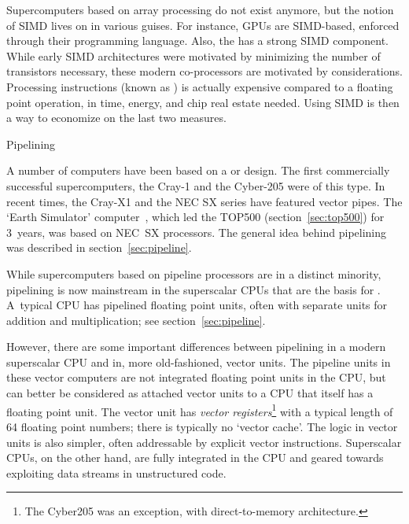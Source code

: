Supercomputers based on array processing do not exist anymore, but the
notion of SIMD lives on in various guises. For instance, \acp{GPU}
are SIMD-based, enforced through their 
programming language. Also, the  has a
strong SIMD component. While early SIMD architectures were motivated
by minimizing the number of transistors necessary, these modern
co-processors are motivated by 
considerations. Processing instructions (known as
) is actually expensive compared to a
floating point operation, in time, energy, and chip real estate needed.
Using SIMD is then a way to economize on the last two measures.

 {Pipelining}
\label{sec:vector}

A number of computers have been based on a  or  design. The first
commercially successful supercomputers, the Cray-1 and the Cyber-205
were of this type. In recent times, the Cray-X1 and the NEC SX series
have featured vector pipes. The `Earth Simulator'
computer~\cite{Sato2004}, which led the TOP500
(section~\ref{sec:top500}) for 3~years, was based on NEC~SX
processors.  The general idea behind pipelining was described in
section~\ref{sec:pipeline}.

While supercomputers based on pipeline processors are in a distinct
minority, pipelining is now mainstream in the superscalar CPUs that
are the basis for . A~typical CPU has pipelined floating point
units, often with separate units for addition and multiplication; see
section~\ref{sec:pipeline}.

However, there are some important differences between pipelining in a
modern superscalar CPU and in, more old-fashioned, vector units.  The
pipeline units in these vector computers are not integrated floating
point units in the CPU, but can better be considered as attached
vector units to a CPU that itself has a floating point unit. The
vector unit has \emph{vector registers}\footnote
{The Cyber205 was an exception, with direct-to-memory architecture.}
with a typical
length of 64 floating point numbers; there is typically no `vector
cache'. The logic in vector units is also simpler, often addressable
by explicit vector instructions. Superscalar CPUs, on the other hand,
are fully integrated in the CPU and geared towards exploiting data
streams in unstructured code.


